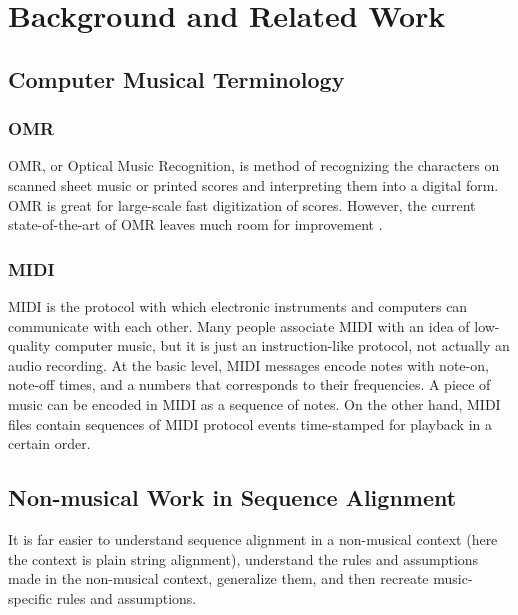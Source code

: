 \chapter{Background and Related Work}
\section{Computer Musical Terminology}

\subsection{OMR}
OMR, or Optical Music Recognition, is method of recognizing the characters on scanned sheet music or printed scores and interpreting them into a digital form. OMR is great for large-scale fast digitization of scores. However, the current state-of-the-art of OMR leaves much room for improvement \cite{rebelo}. 

\subsection{MIDI}
MIDI is the protocol with which electronic instruments and computers can communicate with each other. Many people associate MIDI with an idea of low-quality computer music, but it is just an instruction-like protocol, not actually an audio recording. At the basic level, MIDI messages encode notes with note-on, note-off times, and a numbers that corresponds to their frequencies. A piece of music can be encoded in MIDI as a sequence of notes. On the other hand, MIDI files contain sequences of MIDI protocol events time-stamped for playback in a certain order.

\section{Non-musical Work in Sequence Alignment}
It is far easier to understand sequence alignment in a non-musical context (here the context is plain string alignment), understand the rules and assumptions made in the non-musical context, generalize them, and then recreate music-specific rules and assumptions. 

